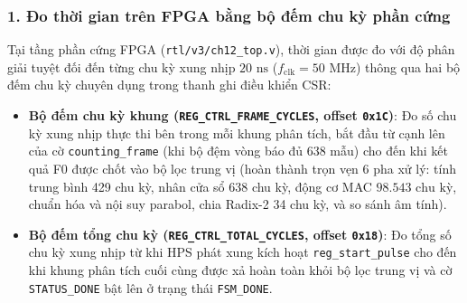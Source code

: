 \subsubsection*{1. Đo thời gian trên FPGA bằng bộ đếm chu kỳ phần cứng}
Tại tầng phần cứng FPGA (\texttt{rtl/v3/ch12\_top.v}), thời gian được đo với độ phân giải tuyệt đối đến từng chu kỳ xung nhịp $20\text{ ns}$ ($f_{\text{clk}} = 50\text{ MHz}$) thông qua hai bộ đếm chu kỳ chuyên dụng trong thanh ghi điều khiển CSR:
\begin{itemize}
    \item \textbf{Bộ đếm chu kỳ khung (\texttt{REG\_CTRL\_FRAME\_CYCLES}, offset \texttt{0x1C})}: Đo số chu kỳ xung nhịp thực thi bên trong mỗi khung phân tích, bắt đầu từ cạnh lên của cờ \texttt{counting\_frame} (khi bộ đệm vòng báo đủ 638 mẫu) cho đến khi kết quả F0 được chốt vào bộ lọc trung vị (hoàn thành trọn vẹn 6 pha xử lý: tính trung bình 429 chu kỳ, nhân cửa sổ 638 chu kỳ, động cơ MAC $98.543\text{ chu kỳ}$, chuẩn hóa và nội suy parabol, chia Radix-2 34 chu kỳ, và so sánh âm tính).
    \item \textbf{Bộ đếm tổng chu kỳ (\texttt{REG\_CTRL\_TOTAL\_CYCLES}, offset \texttt{0x18})}: Đo tổng số chu kỳ xung nhịp từ khi HPS phát xung kích hoạt \texttt{reg\_start\_pulse} cho đến khi khung phân tích cuối cùng được xả hoàn toàn khỏi bộ lọc trung vị và cờ \texttt{STATUS\_DONE} bật lên ở trạng thái \texttt{FSM\_DONE}.
\end{itemize}

